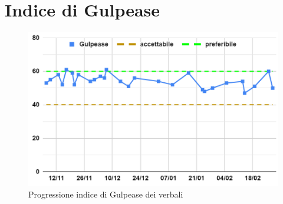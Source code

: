 \section{Indice di Gulpease}
\begin{figure}[H]
    \centering
    \includegraphics[width=0.8\linewidth]{GulpeaseVerbaliProgresso.png}
    \caption{Progressione indice di Gulpease dei verbali}
\end{figure}
